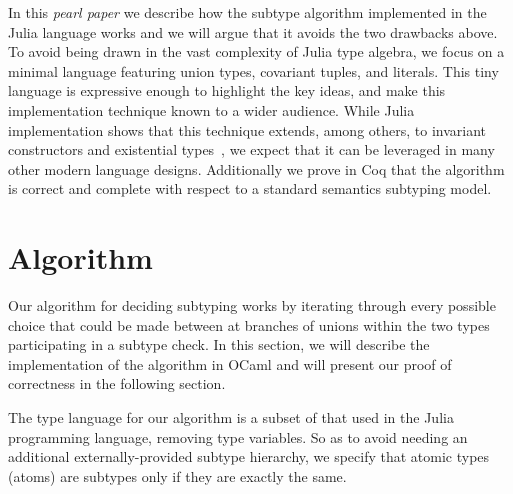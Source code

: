 \documentclass[a4paper,english]{lipics-v2018}
\begin{document}
In this \emph{pearl paper} we describe how the subtype algorithm
implemented in the Julia language works and we will argue that it
avoids the two drawbacks above.  To avoid being drawn in the vast
complexity of Julia type algebra, we focus on a minimal language
featuring union types, covariant tuples, and literals.  This tiny
language is expressive enough to highlight the key ideas, and make
this implementation technique known to a wider audience.  While Julia
implementation shows that this technique extends, among others, to
invariant constructors and existential
types~\cite{DBLP:journals/pacmpl/NardelliBPCBV18}, we expect that it
can be leveraged in many other modern language designs.  Additionally
we prove in Coq that the algorithm is correct and complete with
respect to a standard semantics subtyping model.


\section{Algorithm}

Our algorithm for deciding subtyping works by iterating through every possible
choice that could be made between at branches of unions within the two types
participating in a subtype check. In this section, we will describe the
implementation of the algorithm in OCaml and will present our proof of
correctness in the following section.

The type language for our algorithm is a subset of that used in the Julia
programming language, removing type variables. So as to avoid needing an
additional externally-provided subtype hierarchy, we specify that atomic types
(atoms) are subtypes only if they are exactly the same.

\hspace{1em}
\end{document}
